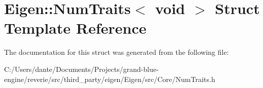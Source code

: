 \hypertarget{struct_eigen_1_1_num_traits_3_01void_01_4}{}\section{Eigen\+::Num\+Traits$<$ void $>$ Struct Template Reference}
\label{struct_eigen_1_1_num_traits_3_01void_01_4}


The documentation for this struct was generated from the following file\+:\begin{DoxyCompactItemize}
\item 
C\+:/\+Users/dante/\+Documents/\+Projects/grand-\/blue-\/engine/reverie/src/third\+\_\+party/eigen/\+Eigen/src/\+Core/Num\+Traits.\+h\end{DoxyCompactItemize}
